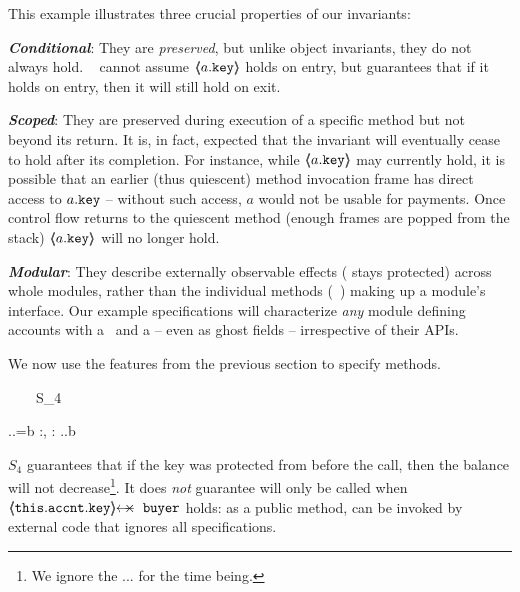 {{ 
\noindent
This example illustrates three crucial properties of our invariants:
 \begin{customquote}
 \vspace{.05cm}
\noindent
\textbf{\emph{Conditional}}: They %
are \emph{preserved}, but unlike object invariants, they do not %
always hold.
\ \Eg   {} cannot assume $\langle\!\!\langle a.\mbox{\normalfont{\texttt{key}}} \rangle\!\!\rangle$ holds on entry, but   guarantees that if it holds on entry, then  it will still hold on exit.

\vspace{.05cm}
\noindent
\textbf{\emph{Scoped}}:  %
They %
 are preserved during  execution of a specific method but not beyond its return. It is, in fact, expected that the invariant will eventually cease to hold after its completion. For instance, while $\langle\!\!\langle a.\mbox{\normalfont{\texttt{key}}} \rangle\!\!\rangle$ may currently hold, it is possible that an earlier (thus quiescent) method invocation frame has direct access to $a.\mbox{\normalfont{\texttt{key}}}$ -- without such access, $a$ would not be usable for payments. Once control flow returns to the quiescent method (\ie enough frames are popped from the stack) $\langle\!\!\langle a.\mbox{\normalfont{\texttt{key}}} \rangle\!\!\rangle$  will no longer hold.

 \vspace{.05cm}
\noindent
\textbf{\emph{Modular}}: They %
describe  externally observable effects (\eg  {} stays protected) across whole modules,
rather than  the individual methods (\eg\, ) making up a module's interface.
Our example specifications will
characterize \emph{any}
module defining accounts with a  %
 \balance~and a \prg{\password} -- even as ghost fields --  irrespective of their APIs. %
 \end{customquote}
 
 \begin{example}
 We   now use the features from the previous section to specify methods. 

{\sprepostShort
		{\strut \ \ \ \ S_4} 
		{    {} \wedge {}.\prg{\myAccount}.\prg{\balance}=b
		 }
		{} {} {:, : }
		{ 
		  .\prg{\myAccount}.\prg{\balance}\geq b
		} 
		}

\noindent
$S_4$  guarantees that if the  key was protected from  before the call, then the balance will not decrease\footnote{We ignore the ... for the time being.}.
 It does \emph{not} guarantee  will only be called when $\protectedFrom{\prg{this}.\prg{\myAccount}.\prg{key}} {\prg{buyer}}$ holds: 
as a  public method,    can be invoked by external code that ignores all specifications.
\end{example}

}}
